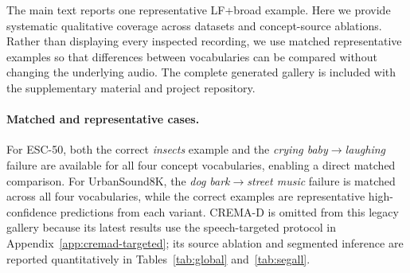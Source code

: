 \documentclass[10pt]{article}
\begin{document}
The main text reports one representative LF+broad example. Here we provide systematic qualitative coverage across datasets and concept-source ablations. Rather than displaying every inspected recording, we use matched representative examples so that differences between vocabularies can be compared without changing the underlying audio. The complete generated gallery is included with the supplementary material and project repository.

\paragraph{Matched and representative cases.}
For ESC-50, both the correct \emph{insects} example and the \emph{crying baby}$\rightarrow$\emph{laughing} failure are available for all four concept vocabularies, enabling a direct matched comparison. For UrbanSound8K, the \emph{dog bark}$\rightarrow$\emph{street music} failure is matched across all four vocabularies, while the correct examples are representative high-confidence predictions from each variant. CREMA-D is omitted from this legacy gallery because its latest results use the speech-targeted protocol in Appendix~\ref{app:cremad-targeted}; its source ablation and segmented inference are reported quantitatively in Tables~\ref{tab:global} and~\ref{tab:segall}.
\end{document}
